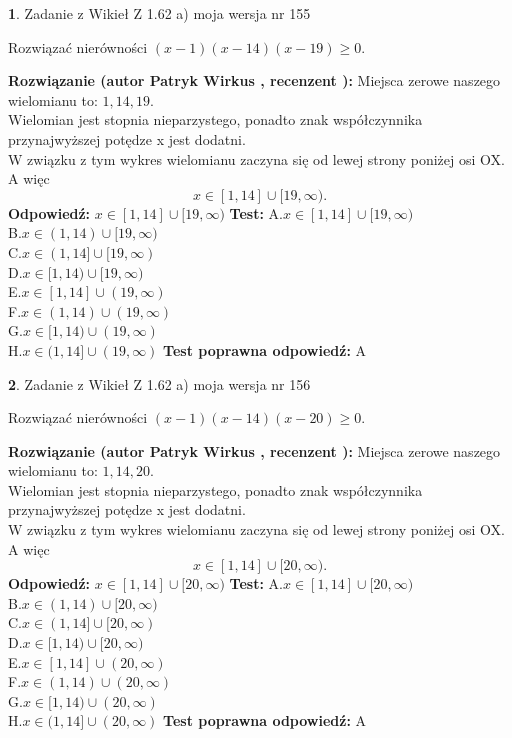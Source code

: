 \documentclass[12pt, a4paper]{article}
\theoremstyle{definition} %
\newtheorem{zad}{}
\newcommand{\zadStart}[1]{\begin{zad}#1\newline}
\newcommand{\zadStop}{\end{zad}}
\newcommand{\rozwStart}[2]{\noindent \textbf{Rozwiązanie (autor #1 , recenzent #2): }\newline}
\newcommand{\rozwStop}{\newline}
\newcommand{\odpStart}{\noindent \textbf{Odpowiedź:}\newline}
\newcommand{\odpStop}{\newline}
\newcommand{\testStart}{\noindent \textbf{Test:}\newline}
\newcommand{\testStop}{\newline}
\newcommand{\kluczStart}{\noindent \textbf{Test poprawna odpowiedź:}\newline}
\newcommand{\kluczStop}{\newline}
\begin{document}
\zadStart{Zadanie z Wikieł Z 1.62 a) moja wersja nr 155}

Rozwiązać nierówności $(x-1)(x-14)(x-19)\ge0$.
\zadStop
\rozwStart{Patryk Wirkus}{}
Miejsca zerowe naszego wielomianu to: $1, 14, 19$.\\
Wielomian jest stopnia nieparzystego, ponadto znak współczynnika przy\linebreak najwyższej potędze x jest dodatni.\\ W związku z tym wykres wielomianu zaczyna się od lewej strony poniżej osi OX. A więc $$x \in [1,14] \cup [19,\infty).$$
\rozwStop
\odpStart
$x \in [1,14] \cup [19,\infty)$
\odpStop
\testStart
A.$x \in [1,14] \cup [19,\infty)$\\
B.$x \in (1,14) \cup [19,\infty)$\\
C.$x \in (1,14] \cup [19,\infty)$\\
D.$x \in [1,14) \cup [19,\infty)$\\
E.$x \in [1,14] \cup (19,\infty)$\\
F.$x \in (1,14) \cup (19,\infty)$\\
G.$x \in [1,14) \cup (19,\infty)$\\
H.$x \in (1,14] \cup (19,\infty)$
\testStop
\kluczStart
A
\kluczStop



\zadStart{Zadanie z Wikieł Z 1.62 a) moja wersja nr 156}

Rozwiązać nierówności $(x-1)(x-14)(x-20)\ge0$.
\zadStop
\rozwStart{Patryk Wirkus}{}
Miejsca zerowe naszego wielomianu to: $1, 14, 20$.\\
Wielomian jest stopnia nieparzystego, ponadto znak współczynnika przy\linebreak najwyższej potędze x jest dodatni.\\ W związku z tym wykres wielomianu zaczyna się od lewej strony poniżej osi OX. A więc $$x \in [1,14] \cup [20,\infty).$$
\rozwStop
\odpStart
$x \in [1,14] \cup [20,\infty)$
\odpStop
\testStart
A.$x \in [1,14] \cup [20,\infty)$\\
B.$x \in (1,14) \cup [20,\infty)$\\
C.$x \in (1,14] \cup [20,\infty)$\\
D.$x \in [1,14) \cup [20,\infty)$\\
E.$x \in [1,14] \cup (20,\infty)$\\
F.$x \in (1,14) \cup (20,\infty)$\\
G.$x \in [1,14) \cup (20,\infty)$\\
H.$x \in (1,14] \cup (20,\infty)$
\testStop
\kluczStart
A
\kluczStop
\end{document}
